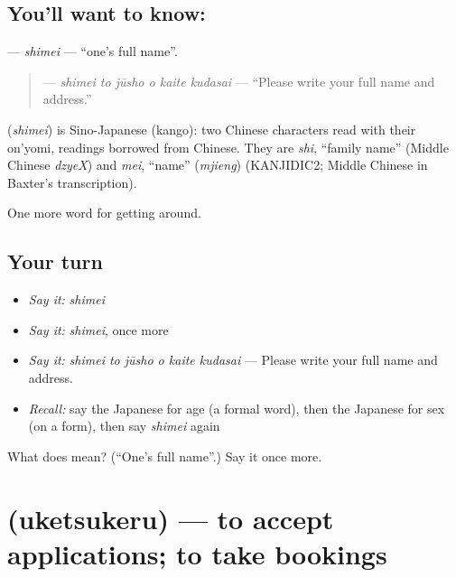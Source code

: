 \subsection*{You'll want to know: }
\textbf{} — \emph{shimei} — \textquotedblleft{}one's full name\textquotedblright{}.

\begin{quote}
\textbf{   } — \emph{shimei to jūsho o kaite kudasai} — \textquotedblleft{}Please write your full name and address.\textquotedblright{}
\end{quote}

\begin{cousinweb}
\textbf{} (\emph{shimei}) is Sino-Japanese (kango): two Chinese characters read with their on'yomi, readings borrowed from Chinese. They are \emph{shi}, \textquotedblleft{}family name\textquotedblright{} (Middle Chinese \emph{dzyeX}) and \emph{mei}, \textquotedblleft{}name\textquotedblright{} (\emph{mjieng}) (KANJIDIC2; Middle Chinese in Baxter's transcription).
\end{cousinweb}

\begin{grammarlens}[title={What you've built}]
One more word for getting around.
\end{grammarlens}

\subsection*{Your turn}
\begin{itemize}
\raggedright
  \item \emph{Say it:} \emph{shimei}
  \item \emph{Say it:} \emph{shimei}, once more
  \item \emph{Say it:} \emph{shimei to jūsho o kaite kudasai} — Please write your full name and address.
  \item \emph{Recall:} say the Japanese for age (a formal word), then the Japanese for sex (on a form), then say \emph{shimei} again
\end{itemize}

\begin{tcolorbox}[breakable,colback=teal!4,colframe=teal!35!black,title={Before you move on}]
What does  mean? (\textquotedblleft{}One's full name\textquotedblright{}.) Say it once more.
\end{tcolorbox}
\section[\texorpdfstring{\ja{うけつける} (uketsukeru)}{うけつける (uketsukeru)}]{ (uketsukeru) — to accept applications; to take bookings}


